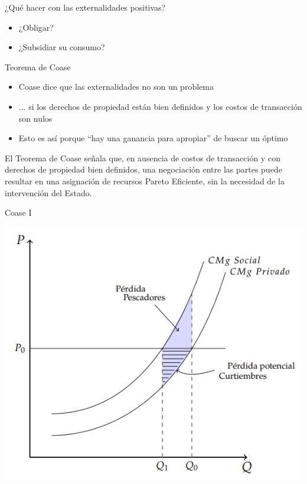 \documentclass{beamer}
\begin{document}
\begin{frame}{¿Qué hacer con las externalidades positivas?}
    \begin{itemize}
        \item ¿Obligar?
        \item ¿Subsidiar su consumo?
    \end{itemize}
\end{frame}

\begin{frame}{Teorema de Coase}
    \begin{itemize}
        \item Coase dice que las externalidades no son un problema
        \item ... si los derechos de propiedad están bien definidos y los costos de transacción son nulos
        \item Esto es así porque ``hay una ganancia para apropiar'' de buscar un óptimo 
    \end{itemize}
    \begin{boxA}
        \centering
        El Teorema de Coase señala que, en ausencia de costos de transacción y con derechos de propiedad bien definidos, una negociación
        entre las partes puede resultar en una asignación de recursos
        Pareto Eficiente, sin la necesidad de la intervención del Estado.
    \end{boxA}
\end{frame}

\begin{frame}{Coase I}
    \begin{center}
        \includegraphics[scale=0.7]{../Figures/C25.6.png}
    \end{center}
\end{frame}
 
\end{document}
